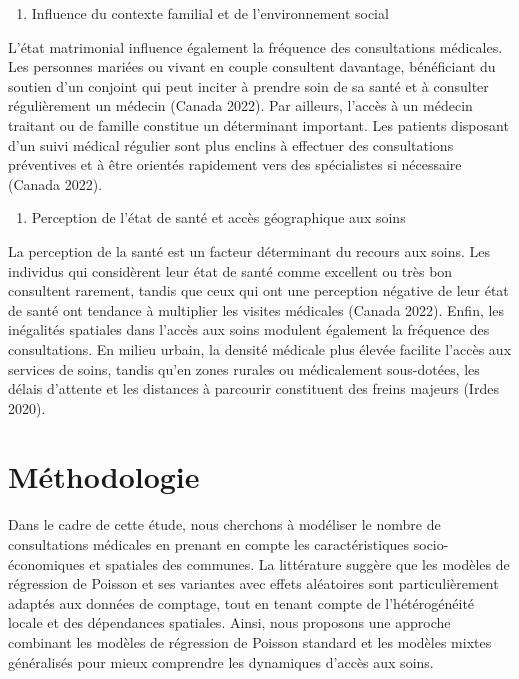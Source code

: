 \documentclass[
]{article}
\providecommand{\tightlist}{%
  \setlength{\itemsep}{0pt}\setlength{\parskip}{0pt}}
\begin{document}
\begin{enumerate}
\def\labelenumi{\arabic{enumi}.}
\setcounter{enumi}{2}
\tightlist
\item
  Influence du contexte familial et de l'environnement social
\end{enumerate}

L'état matrimonial influence également la fréquence des consultations
médicales. Les personnes mariées ou vivant en couple consultent
davantage, bénéficiant du soutien d'un conjoint qui peut inciter à
prendre soin de sa santé et à consulter régulièrement un médecin (Canada
2022). Par ailleurs, l'accès à un médecin traitant ou de famille
constitue un déterminant important. Les patients disposant d'un suivi
médical régulier sont plus enclins à effectuer des consultations
préventives et à être orientés rapidement vers des spécialistes si
nécessaire (Canada 2022).

\begin{enumerate}
\def\labelenumi{\arabic{enumi}.}
\setcounter{enumi}{3}
\tightlist
\item
  Perception de l'état de santé et accès géographique aux soins
\end{enumerate}

La perception de la santé est un facteur déterminant du recours aux
soins. Les individus qui considèrent leur état de santé comme excellent
ou très bon consultent rarement, tandis que ceux qui ont une perception
négative de leur état de santé ont tendance à multiplier les visites
médicales (Canada 2022). Enfin, les inégalités spatiales dans l'accès
aux soins modulent également la fréquence des consultations. En milieu
urbain, la densité médicale plus élevée facilite l'accès aux services de
soins, tandis qu'en zones rurales ou médicalement sous-dotées, les
délais d'attente et les distances à parcourir constituent des freins
majeurs (Irdes 2020).

\section{Méthodologie}\label{muxe9thodologie}

Dans le cadre de cette étude, nous cherchons à modéliser le nombre de
consultations médicales en prenant en compte les caractéristiques
socio-économiques et spatiales des communes. La littérature suggère que
les modèles de régression de Poisson et ses variantes avec effets
aléatoires sont particulièrement adaptés aux données de comptage, tout
en tenant compte de l'hétérogénéité locale et des dépendances spatiales.
Ainsi, nous proposons une approche combinant les modèles de régression
de Poisson standard et les modèles mixtes généralisés pour mieux
comprendre les dynamiques d'accès aux soins.
\end{document}
